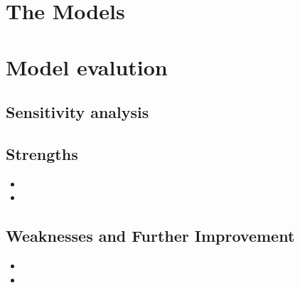 \documentclass[12pt]{article}  %
\begin{document}
\section{The Models}










\section{Model evalution}
\subsection{Sensitivity analysis}


\subsection{Strengths}
\begin{itemize}
\item 

\item	
\end{itemize}

\subsection{Weaknesses and Further Improvement}
\begin{itemize}
\item 
\item	
 \end{itemize}
\end{document}
